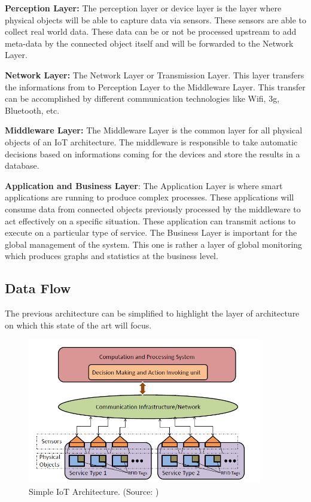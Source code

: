 \documentclass[11pt]{article}
\begin{document}
\textbf{Perception Layer:} The perception layer or device layer is the layer where physical objects will be able to capture data via sensors. These sensors are able to collect real world data. These data can be or not be processed upstream to add meta-data by the connected object itself and will be forwarded to the Network Layer.

\textbf{Network Layer:} The Network Layer or Transmission Layer. This layer transfers the informations from to Perception Layer to the Middleware Layer. This transfer can be accomplished by different communication technologies like Wifi, 3g, Bluetooth, etc.

\textbf{Middleware Layer:} The Middleware Layer is the common layer for all physical objects of an IoT architecture. The middleware is responsible to take automatic decisions based on informations coming for the devices and store the results in a database. 

\textbf{Application and Business Layer}: The Application Layer is where smart applications are running to produce complex processes. These applications will consume data from connected objects previously processed by the middleware to act effectively on a specific situation. These application can transmit actions to execute on a particular type of service. The Business Layer is important for the global management of the system. This one is rather a layer of global monitoring which produces graphs and statistics at the business level.

\subsection{Data Flow}

The previous architecture can be simplified to highlight the layer of architecture on which this state of the art will focus.
\newline
\begin{figure}[h]
	\includegraphics[width=\textwidth,height=180pt]{assets/Basic_IOT_Architecture.png} 
	\caption[Simple IoT Architecture]{Simple IoT Architecture. (Source: \cite{Future-Internet-The-Internet-of-Things})}
	\label{fig:simpleArchitecture}
\end{figure}
\end{document}

